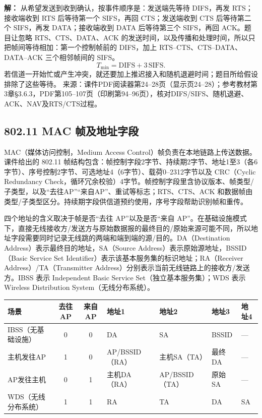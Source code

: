 \textbf{解：} 从希望发送到收到确认，按事件顺序是：发送端先等待 DIFS，再发 RTS；接收端收到 RTS 后等待第一个 SIFS，再回 CTS；发送端收到 CTS 后等待第二个 SIFS，再发 DATA；接收端收到 DATA 后等待第三个 SIFS，再回 ACK。题目让忽略 RTS、CTS、DATA、ACK 的发送时间，以及传播和处理时间，所以只把帧间等待相加：第一个控制帧前的 DIFS，加上 RTS--CTS、CTS--DATA、DATA--ACK 三个相邻帧间的 SIFS。
\[
  T_{\min}=\mathrm{DIFS}+3\,\mathrm{SIFS}.
\]
若信道一开始忙或产生冲突，就还要加上推迟接入和随机退避时间；题目所给假设排除了这些等待。
\annotationarea[4]
\small 来源：课件PDF阅读器第24--28页（显示页24--28）；参考教材第3章§3.6.3，PDF第105--107页（印刷第94--96页），核对DIFS/SIFS、随机退避、ACK、NAV及RTS/CTS过程。\normalsize

\subsection{802.11 MAC 帧及地址字段}
MAC（媒体访问控制，Medium Access Control）帧负责在本地链路上传送数据。课件给出的 802.11 帧结构包含：帧控制字段2字节、持续期2字节、地址1至3（各6字节）、序号控制2字节、可选地址4（6字节）、载荷0--2312字节以及 CRC（Cyclic Redundancy Check，循环冗余校验）4字节。帧控制字段里含协议版本、帧类型/子类型，以及“去往AP”“来自AP”、重试等标志；RTS、CTS、ACK 和数据帧由类型/子类型区分。持续期字段供信道预约使用，序号字段帮助识别帧和重传。

四个地址的含义取决于帧是否“去往 AP”以及是否“来自 AP”。在基础设施模式下，直接无线接收方/发送方与原始数据报的最终目的/原始来源可能不同，所以地址字段需要同时记录无线跳的两端和端到端的源/目的。DA（Destination Address）表示最终目的地址，SA（Source Address）表示原始源地址，BSSID（Basic Service Set Identifier）表示该基本服务集的标识地址；RA（Receiver Address）/TA（Transmitter Address）分别表示当前无线链路上的接收方/发送方。IBSS 表示 Independent Basic Service Set（独立基本服务集）；WDS 表示 Wireless Distribution System（无线分布系统）。

\begin{center}\small
\begin{tabularx}{.98\textwidth}{l c c X X X X}\toprule
场景 & 去往AP & 来自AP & 地址1 & 地址2 & 地址3 & 地址4 \\\midrule
IBSS（无基础设施） & 0 & 0 & DA & SA & BSSID & — \\
主机发往AP & 1 & 0 & AP/BSSID（RA） & 主机SA（TA） & 最终DA & — \\
AP发往主机 & 0 & 1 & 主机DA（RA） & AP/BSSID（TA） & 原始SA & — \\
WDS（无线分布系统） & 1 & 1 & RA & TA & DA & SA \\\bottomrule
\end{tabularx}\end{center}

